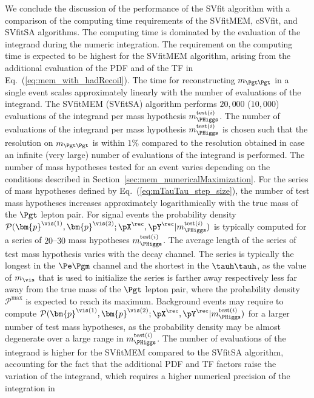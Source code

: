 We conclude the discussion of the performance of the SVfit algorithm
with a comparison of the computing time requirements of the SVfitMEM,
cSVfit, and SVfitSA algorithms.
The computing time is dominated by the
evaluation of the integrand during the numeric integration.
The requirement on the computing time is expected to be
highest for the SVfitMEM algorithm, arising from the additional evaluation of the PDF and of the TF in Eq.~(\ref{eq:mem_with_hadRecoil}).
The time for reconstructing $m_{\Pgt\Pgt}$ in a single event scales approximately linearly
with the number of evaluations of the integrand.
The SVfitMEM (SVfitSA) algorithm performs $20,000$ ($10,000$)
evaluations of the integrand per mass hypothesis
$m_{\PHiggs}^{\textrm{test}(i)}$.
The number of evaluations of the integrand per mass hypothesis $m_{\PHiggs}^{\textrm{test}(i)}$ is chosen such that the
resolution on $m_{\Pgt\Pgt}$ is within $1\%$ compared to the resolution obtained in case an infinite (very large) number of evaluations of the
integrand is performed.
The number of mass hypotheses tested for an event varies depending on the
conditions described in Section~\ref{sec:mem_numericalMaximization}.
For the series of mass hypotheses defined by Eq.~(\ref{eq:mTauTau_step_size}), the number of test mass
hypotheses increases approximately logarithmically with the
true mass of the $\Pgt$ lepton pair. 
For signal events the probability density $\mathcal{P}(\bm{p}^{\vis(1)},\bm{p}^{\vis(2)};\pX^{\rec},\pY^{\rec}|m_{\PHiggs}^{\textrm{test}(i)})$
is typically computed for a series of $20$--$30$ mass hypotheses $m_{\PHiggs}^{\textrm{test}(i)}$.
The average length of the series of test mass hypothesis varies with the decay channel.
The series is typically the longest in the $\Pe\Pgm$ channel and the shortest in the $\tauh\tauh$,
as the value of $m_{\vis}$ that is used to initialize the series is farther away respectively less far away from the true mass of the $\Pgt$ lepton pair,
where the probability density $\mathcal{P}^{\textrm{max}}$ is expected to reach its maximum.
Background events may require to compute $\mathcal{P}(\bm{p}^{\vis(1)},\bm{p}^{\vis(2)};\pX^{\rec},\pY^{\rec}|m_{\PHiggs}^{\textrm{test}(i)})$ for a larger number of test mass hypotheses,
as the probability density may be almost degenerate over a large range in $m_{\PHiggs}^{\textrm{test}(i)}$.
The number of evaluations of the integrand is higher for the SVfitMEM
compared to the SVfitSA algorithm, accounting for the fact that the additional PDF and TF factors
raise the variation of the integrand,
which requires a higher numerical precision of the integration in
